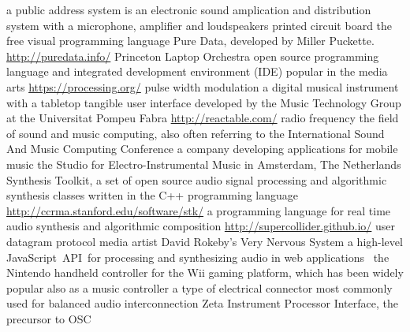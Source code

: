  a public address system is an electronic sound amplication and distribution system with a microphone, amplifier and loudspeakers
 printed circuit board
 the free visual programming language Pure Data, developed by Miller Puckette.   \url{http://puredata.info/}
 Princeton Laptop Orchestra %
 open source programming language and integrated development environment (IDE) popular in the media arts  \url{https://processing.org/}
 pulse width modulation 
 a digital musical instrument with a tabletop tangible user interface developed by the Music Technology Group at the Universitat Pompeu Fabra  \url{http://reactable.com/}
 radio frequency 
 the field of sound and music computing, also often referring to the International Sound And Music Computing Conference %
 a company developing applications for mobile music %
 the Studio for Electro-Instrumental Music in Amsterdam, The Netherlands %
 Synthesis Toolkit, a set of open source audio signal processing and algorithmic synthesis classes written in the C++ programming language  \url{http://ccrma.stanford.edu/software/stk/}
 a programming language for real time audio synthesis and algorithmic composition \url{http://supercollider.github.io/}
 user datagram protocol %
 media artist David Rokeby's Very Nervous System %
 a high-level JavaScript API for processing and synthesizing audio in web applications 
 the Nintendo handheld controller for the Wii gaming platform, which has been widely popular also as a music controller
 a type of electrical connector most commonly used for balanced audio interconnection
 Zeta Instrument Processor Interface, the precursor to OSC %